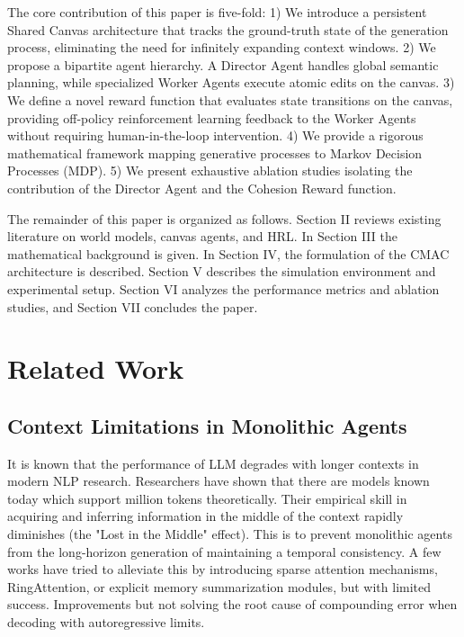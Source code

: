 \documentclass[pdflatex,sn-mathphys-num]{sn-jnl}
\begin{document}
The core contribution of this paper is five-fold:
1) We introduce a persistent Shared Canvas architecture that tracks the ground-truth state of the generation process, eliminating the need for infinitely expanding context windows.
2) We propose a bipartite agent hierarchy. A Director Agent handles global semantic planning, while specialized Worker Agents execute atomic edits on the canvas.
3) We define a novel reward function that evaluates state transitions on the canvas, providing off-policy reinforcement learning feedback to the Worker Agents without requiring human-in-the-loop intervention.
4) We provide a rigorous mathematical framework mapping generative processes to Markov Decision Processes (MDP).
5) We present exhaustive ablation studies isolating the contribution of the Director Agent and the Cohesion Reward function.

The remainder of this paper is organized as follows. Section II reviews existing literature on world models, canvas agents, and HRL. In Section III the mathematical background is given. In Section IV, the formulation of the CMAC architecture is described. Section V describes the simulation environment and experimental setup. Section VI analyzes the performance metrics and ablation studies, and Section VII concludes the paper.

\section{Related Work}

\subsection{Context Limitations in Monolithic Agents}
It is known that the performance of LLM degrades with longer contexts in modern NLP research. Researchers have shown that there are models known today which support million tokens theoretically. Their empirical skill in acquiring and inferring information in the middle of the context rapidly diminishes (the "Lost in the Middle" effect). This is to prevent monolithic agents from the long-horizon generation of maintaining a temporal consistency. A few works have tried to alleviate this by introducing sparse attention mechanisms, RingAttention, or explicit memory summarization modules, but with limited success. Improvements but not solving the root cause of compounding error when decoding with autoregressive limits.
\end{document}
